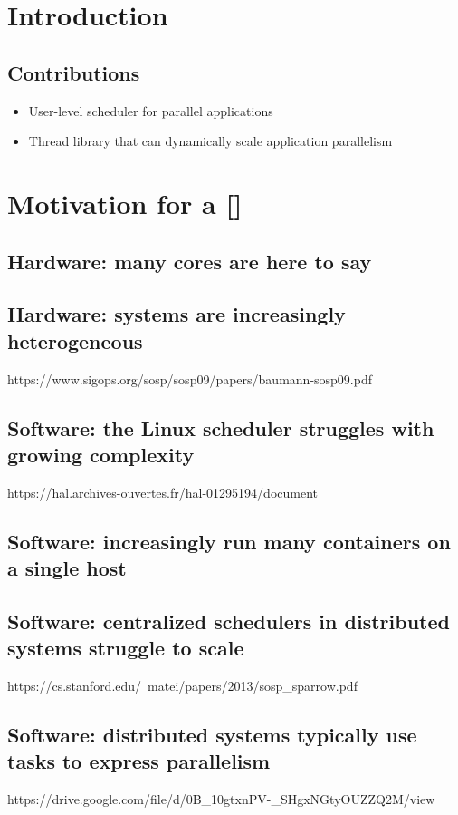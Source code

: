 \documentclass[10pt,preprint]{sigplanconf}
\begin{document}
\section{Introduction}

\subsection*{Contributions}
\begin{itemize}
  \item User-level scheduler for parallel applications
  \item Thread library that can dynamically scale application parallelism
\end{itemize}

\section{Motivation for a []}
\subsection{Hardware: many cores are here to say}
\subsection{Hardware: systems are increasingly heterogeneous}
https://www.sigops.org/sosp/sosp09/papers/baumann-sosp09.pdf
\subsection{Software: the Linux scheduler struggles with growing complexity}
https://hal.archives-ouvertes.fr/hal-01295194/document
\subsection{Software: increasingly run many containers on a single host}
\subsection{Software: centralized schedulers in distributed systems struggle to scale}
https://cs.stanford.edu/~matei/papers/2013/sosp\_sparrow.pdf

\subsection{Software: distributed systems typically use tasks to express parallelism}
https://drive.google.com/file/d/0B\_10gtxnPV-\_SHgxNGtyOUZZQ2M/view
\end{document}
